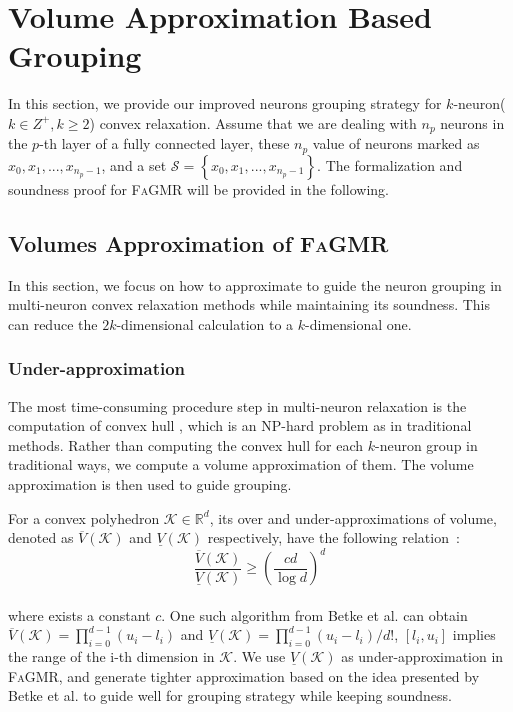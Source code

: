 \documentclass[runningheads]{llncs}
\newcommand{\ourtool}{\textsc{FaGMR}\xspace}
\begin{document}
%
%
%

\section{Volume Approximation Based Grouping}\label{Sec3}
\label{sec:method}

In this section, we provide our improved neurons grouping
strategy for $k$-neuron($k \in Z^{+}, k \geq 2$) convex relaxation.
Assume that we are dealing with $n_{p}$ neurons in the $p$-th layer of a fully connected layer, these $n_{p}$ value of neurons marked as $x_{0},x_{1},...,x_{n_{p}-1}$, and a set $\mathcal{S}=\left \{x_{0},x_{1},...,x_{n_{p}-1}\right \}$.
The formalization and soundness proof for \ourtool will be provided in the following.

%
%
%
\subsection{Volumes Approximation of \ourtool}\label{mvee}
In this section, we focus on how to approximate to guide the neuron grouping in multi-neuron convex relaxation methods while maintaining its soundness. This can reduce the $2k$-dimensional calculation to a $k$-dimensional one. 

\subsubsection{Under-approximation}\label{mvee}

The most time-consuming procedure step in multi-neuron relaxation is the 
computation of convex hull , which is an NP-hard problem as in traditional methods.
Rather than computing the convex hull for each $k$-neuron group
in traditional ways,
we compute a volume approximation of them.
The volume approximation is then used to guide grouping.

For a convex polyhedron $\mathcal{K} \in \mathbb{R}^{d}$, its
over and under-approximations of volume, denoted as $\overline{V}(\mathcal{K})$ and $\underline{V}(\mathcal{K})$ respectively,
have the following relation~\cite{elekes1986geometric}:
$$
\frac{\overline{V}(\mathcal{K})}{\underline{V}(\mathcal{K})} \geq \left(\frac{cd}{\log d}\right)^{d}
$$\\
where exists a constant $c$.
One such algorithm from Betke et al.
can obtain $\overline{V}(\mathcal{K}) = \prod_{i=0}^{d-1}(u_{i}-l_{i})$ and $\underline{V}(\mathcal{K}) = \prod_{i=0}^{d-1}(u_{i}-l_{i})/d!$, $[l_{i},u_{i}]$ implies the range of the i-th dimension in $\mathcal{K}$.
We use $\underline{V}(\mathcal{K})$ as under-approximation in \ourtool, and generate tighter approximation based on
the idea presented by Betke et al. to guide well for grouping strategy while keeping soundness. 
%
%
%
\end{document}
